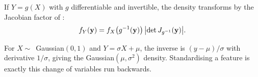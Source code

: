 If \(Y=g(X)\) with \(g\) differentiable and invertible, the density transforms by
the Jacobian factor of :
\[
	f_Y(\mathbf{y})=f_X\bigl(g^{-1}(\mathbf{y})\bigr)\,
	\bigl|\det J_{g^{-1}}(\mathbf{y})\bigr| .
\]

\begin{example}
For \(X\sim\)~Gaussian\((0,1)\) and \(Y=\sigma X+\mu\), the inverse is
\((y-\mu)/\sigma\) with derivative \(1/\sigma\), giving the
Gaussian\((\mu,\sigma^{2})\) density. Standardising a feature is exactly this
change of variables run backwards.
\end{example}

